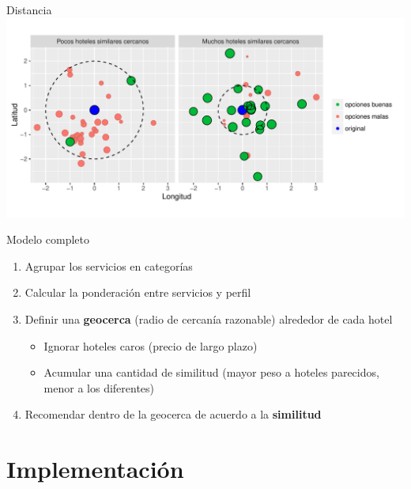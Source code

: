 \documentclass{beamer}
\begin{document}
\begin{frame}{Distancia}
	\includegraphics[width=\textwidth]{imagenes/distdin.pdf}
\end{frame}

\begin{frame}{Modelo completo}
	\begin{enumerate}%
		\item Agrupar los servicios en categorías
		\item Calcular la ponderación entre servicios y perfil
		\item Definir una \textbf{geocerca} (radio de cercanía razonable) alrededor de cada hotel
		\begin{itemize}
			\item Ignorar hoteles caros (precio de largo plazo)
			\item Acumular una cantidad de similitud (mayor peso a hoteles parecidos, menor a los diferentes)
		\end{itemize}
		\item Recomendar dentro de la geocerca de acuerdo a la \textbf{similitud}
	\end{enumerate}
\end{frame}

\section{Implementación}
\end{document}

